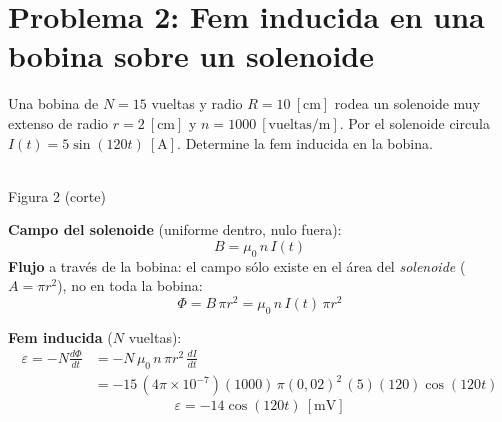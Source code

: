 \documentclass[12pt,letterpaper]{article}
\newcommand{\eps}{\varepsilon}
\begin{document}
\vspace{0.5cm}

\section*{Problema 2: Fem inducida en una bobina sobre un solenoide}

\noindent Una bobina de $N = 15$ vueltas y radio $R = 10\ [\text{cm}]$ rodea un solenoide muy
extenso de radio $r = 2\ [\text{cm}]$ y $n = 1000\ [\text{vueltas/m}]$. Por el solenoide circula
$I(t) = 5\sin(120t)\ [\text{A}]$. Determine la fem inducida en la bobina.

\medskip

\noindent
\begin{minipage}[t]{0.34\textwidth}
\centering\vspace{0pt}
\\[2pt]
{\footnotesize Figura 2 (corte)}
\end{minipage}%
\hfill
\begin{minipage}[t]{0.63\textwidth}
\vspace{0pt}
\textbf{Campo del solenoide} (uniforme dentro, nulo fuera):
\[
    B = \mu_0\,n\,I(t)
\]
\textbf{Flujo} a trav\'es de la bobina: el campo s\'olo existe en el \'area del \emph{solenoide}
($A=\pi r^2$), no en toda la bobina:
\[
    \Phi = B\,\pi r^2 = \mu_0\,n\,I(t)\,\pi r^2
\]
\end{minipage}

\medskip

\noindent\textbf{Fem inducida} ($N$ vueltas):
\begin{align*}
    \eps = -N\frac{d\Phi}{dt}
       &= -N\,\mu_0\,n\,\pi r^2\,\frac{dI}{dt} \\
       &= -15\,(4\pi\times10^{-7})(1000)\,\pi(0{,}02)^2\,(5)(120)\cos(120t)
\end{align*}
\[
    \boxed{\eps = -14\cos(120t)\ [\text{mV}]}
\]
\end{document}
